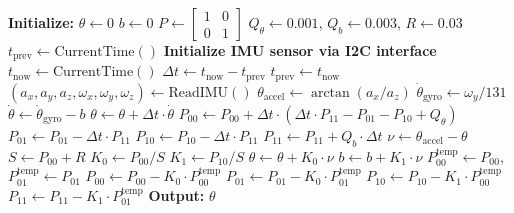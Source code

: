 \begin{algorithm}
\caption{Kalman Filter for IMU Sensor Fusion}
\begin{algorithmic}[1]
\State \textbf{Initialize:}
\State $\theta \gets 0$ 
\State $b \gets 0$ 
\State $P \gets \begin{bmatrix} 1 & 0 \\ 0 & 1 \end{bmatrix}$ 
\State $Q_\theta \gets 0.001$, $Q_b \gets 0.003$, $R \gets 0.03$ 
\State $t_{\text{prev}} \gets \text{CurrentTime}()$
\State
\State \textbf{Initialize IMU sensor via I2C interface}
\State
{}
    \State $t_{\text{now}} \gets \text{CurrentTime}()$
    \State $\Delta t \gets t_{\text{now}} - t_{\text{prev}}$
    \State $t_{\text{prev}} \gets t_{\text{now}}$
    \State
    \State {}
    \State $(a_x, a_y, a_z, \omega_x, \omega_y, \omega_z) \gets \text{ReadIMU}()$
    \State $\theta_{\text{accel}} \gets \arctan(a_x / a_z)$ 
    \State $\dot{\theta}_{\text{gyro}} \gets \omega_y / 131$ 
    \State
    \State {}
    \State $\dot{\theta} \gets \dot{\theta}_{\text{gyro}} - b$
    \State $\theta \gets \theta + \Delta t \cdot \dot{\theta}$
    \State
    \State {}
    \State $P_{00} \gets P_{00} + \Delta t \cdot (\Delta t \cdot P_{11} - P_{01} - P_{10} + Q_\theta)$
    \State $P_{01} \gets P_{01} - \Delta t \cdot P_{11}$
    \State $P_{10} \gets P_{10} - \Delta t \cdot P_{11}$
    \State $P_{11} \gets P_{11} + Q_b \cdot \Delta t$
    \State
    \State {}
    \State $\nu \gets \theta_{\text{accel}} - \theta$ 
    \State $S \gets P_{00} + R$ 
    \State
    \State {}
    \State $K_0 \gets P_{00} / S$
    \State $K_1 \gets P_{10} / S$
    \State
    \State {}
    \State $\theta \gets \theta + K_0 \cdot \nu$
    \State $b \gets b + K_1 \cdot \nu$
    \State
    \State {}
    \State $P_{00}^{\text{temp}} \gets P_{00}$, $P_{01}^{\text{temp}} \gets P_{01}$
    \State $P_{00} \gets P_{00} - K_0 \cdot P_{00}^{\text{temp}}$
    \State $P_{01} \gets P_{01} - K_0 \cdot P_{01}^{\text{temp}}$
    \State $P_{10} \gets P_{10} - K_1 \cdot P_{00}^{\text{temp}}$
    \State $P_{11} \gets P_{11} - K_1 \cdot P_{01}^{\text{temp}}$
    \State
    \State \textbf{Output:} $\theta$ 
\EndWhile
\end{algorithmic}
\end{algorithm}

